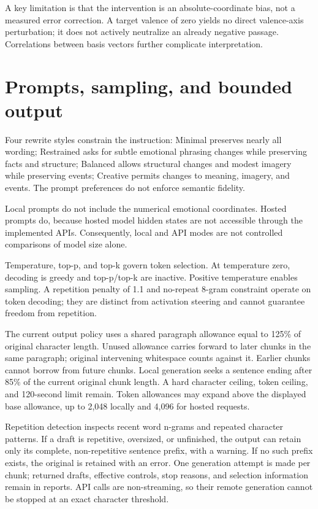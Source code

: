 \documentclass[manuscript,screen,nonacm]{acmart}
\begin{document}
A key limitation is that the intervention is an absolute-coordinate
bias, not a measured error correction. A target valence of zero yields
no direct valence-axis perturbation; it does not actively neutralize an
already negative passage. Correlations between basis vectors further
complicate interpretation.


\section{Prompts, sampling, and bounded
output}\label{prompts-sampling-and-bounded-output}

Four rewrite styles constrain the instruction: Minimal preserves nearly
all wording; Restrained asks for subtle emotional phrasing changes while
preserving facts and structure; Balanced allows structural changes and
modest imagery while preserving events; Creative permits changes to
meaning, imagery, and events. The prompt preferences do not enforce
semantic fidelity.

Local prompts do not include the numerical emotional coordinates. Hosted
prompts do, because hosted model hidden states are not accessible
through the implemented APIs. Consequently, local and API modes are not
controlled comparisons of model size alone.

Temperature, top-p, and top-k govern token selection. At temperature
zero, decoding is greedy and top-p/top-k are inactive. Positive
temperature enables sampling. A repetition penalty of 1.1 and no-repeat
8-gram constraint operate on token decoding; they are distinct from
activation steering and cannot guarantee freedom from repetition.

The current output policy uses a shared paragraph allowance equal to
125\% of original character length. Unused allowance carries forward to
later chunks in the same paragraph; original intervening whitespace
counts against it. Earlier chunks cannot borrow from future chunks.
Local generation seeks a sentence ending after 85\% of the current
original chunk length. A hard character ceiling, token ceiling, and
120-second limit remain. Token allowances may expand above the displayed
base allowance, up to 2,048 locally and 4,096 for hosted requests.

Repetition detection inspects recent word n-grams and repeated character
patterns. If a draft is repetitive, oversized, or unfinished, the output
can retain only its complete, non-repetitive sentence prefix, with a
warning. If no such prefix exists, the original is retained with an
error. One generation attempt is made per chunk; returned drafts,
effective controls, stop reasons, and selection information remain in
reports. API calls are non-streaming, so their remote generation cannot
be stopped at an exact character threshold.
\end{document}
